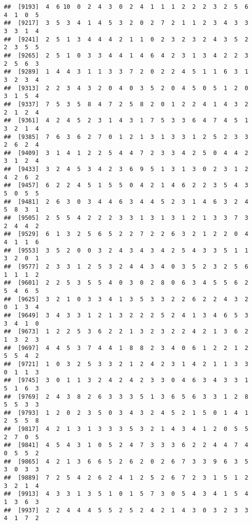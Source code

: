 \documentclass[
]{article}
\begin{document}
\begin{verbatim}
##  [9193]  4  6 10  0  2  4  3  0  2  4  1  1  1  2  2  2  3  2  5  6  4  1  0  5
##  [9217]  3  5  3  4  1  4  5  3  2  0  2  7  2  1  1  2  3  4  3  3  3  3  1  4
##  [9241]  2  5  1  3  4  4  4  2  1  1  0  2  3  2  3  2  4  3  5  2  2  3  5  5
##  [9265]  2  5  1  0  3  3  4  4  1  4  6  4  2  3  1  3  4  2  2  3  2  5  6  3
##  [9289]  1  4  4  3  1  1  3  3  7  2  0  2  2  4  5  1  1  6  3  1  3  2  3  4
##  [9313]  2  2  3  4  3  2  0  4  0  3  5  2  0  4  5  0  5  1  2  0  3  1  5  4
##  [9337]  7  5  3  5  8  4  7  2  5  8  2  0  1  2  2  4  1  4  3  2  2  1  2  4
##  [9361]  4  2  4  5  2  3  1  4  3  1  7  5  3  3  6  4  7  4  5  1  3  2  1  4
##  [9385]  7  6  3  6  2  7  0  1  2  1  3  1  3  3  1  2  5  2  3  3  2  6  2  4
##  [9409]  3  1  4  1  2  2  5  4  4  7  2  3  3  4  2  5  0  4  4  2  3  1  2  4
##  [9433]  3  2  4  5  3  4  2  3  6  9  5  1  3  1  3  0  2  3  1  2  4  2  6  2
##  [9457]  6  2  2  4  5  1  5  5  0  4  2  1  4  6  2  2  3  5  4  3  5  0  5  5
##  [9481]  2  6  3  0  3  4  4  6  3  4  4  5  2  3  1  4  6  3  2  4  5  8  3  1
##  [9505]  2  5  5  4  2  2  2  3  3  1  3  1  3  1  2  1  3  3  7  3  2  4  4  2
##  [9529]  6  1  3  2  5  6  5  2  2  7  2  2  6  3  2  1  2  2  0  4  4  1  1  6
##  [9553]  3  5  2  0  0  3  2  4  3  4  3  4  2  5  4  3  3  5  1  1  3  2  0  1
##  [9577]  2  3  3  1  2  5  3  2  4  4  3  4  0  3  5  2  3  2  5  6  1  1  1  2
##  [9601]  2  2  5  3  5  5  4  0  3  0  2  8  0  6  3  4  5  5  6  2  5  4  6  5
##  [9625]  3  2  1  0  3  3  4  1  3  5  3  3  2  2  6  2  2  4  3  2  0  1  3  4
##  [9649]  3  4  3  3  1  2  1  3  2  2  2  5  2  4  1  3  4  6  5  3  3  4  1  0
##  [9673]  1  2  2  5  3  6  2  2  1  3  2  3  2  2  4  2  1  3  6  2  1  3  2  3
##  [9697]  4  4  5  3  7  4  4  1  8  8  2  3  4  0  6  1  2  2  1  2  5  5  4  2
##  [9721]  1  0  3  2  5  3  3  2  1  2  4  2  3  1  4  2  1  1  3  3  0  1  1  3
##  [9745]  3  0  1  1  3  2  4  2  4  2  3  3  0  4  6  3  4  3  3  1  5  1  6  3
##  [9769]  2  4  3  8  2  6  3  3  3  5  1  3  6  5  6  3  3  1  2  8  5  5  3  3
##  [9793]  1  2  0  2  3  5  0  3  4  3  2  4  5  2  1  5  0  1  4  1  2  5  5  8
##  [9817]  4  2  1  3  1  3  3  3  5  3  2  1  4  3  4  1  2  0  5  5  2  7  0  5
##  [9841]  4  5  4  3  1  0  5  2  4  7  3  3  3  6  2  2  4  4  7  4  0  5  5  2
##  [9865]  4  2  1  3  6  6  5  2  6  2  0  2  6  7  3  3  9  6  3  5  3  0  3  3
##  [9889]  7  2  5  4  2  6  2  4  1  2  5  2  6  7  2  3  1  5  1  2  3  2  1  4
##  [9913]  4  3  3  1  3  5  1  0  1  5  7  3  0  5  4  3  4  1  5  4  1  3  6  3
##  [9937]  2  2  4  4  4  5  5  2  5  2  4  2  1  4  3  0  3  2  3  3  4  1  7  2

\end{verbatim}
\end{document}
